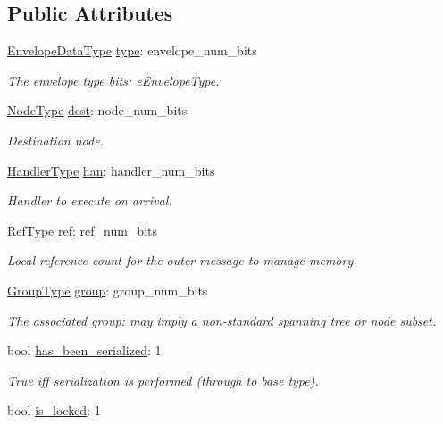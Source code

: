 \subsection*{Public Attributes}
\begin{DoxyCompactItemize}
\item 
\hyperlink{namespacevt_a2740126d59f361d9ba46f66b3b4b0d3d}{Envelope\+Data\+Type} \hyperlink{structvt_1_1messaging_1_1_active_envelope_aaa2cebe2e468e71249feff85841521d4}{type}\+: envelope\+\_\+num\+\_\+bits
\begin{DoxyCompactList}\small\item\em The envelope type bits\+: {\ttfamily e\+Envelope\+Type}. \end{DoxyCompactList}\item 
\hyperlink{namespacevt_a866da9d0efc19c0a1ce79e9e492f47e2}{Node\+Type} \hyperlink{structvt_1_1messaging_1_1_active_envelope_ad82d63430ef2ae4d03c1a986fa2f9350}{dest}\+: node\+\_\+num\+\_\+bits
\begin{DoxyCompactList}\small\item\em Destination node. \end{DoxyCompactList}\item 
\hyperlink{namespacevt_af64846b57dfcaf104da3ef6967917573}{Handler\+Type} \hyperlink{structvt_1_1messaging_1_1_active_envelope_a0d27da3b0da69281b7572ea29fcf61fc}{han}\+: handler\+\_\+num\+\_\+bits
\begin{DoxyCompactList}\small\item\em Handler to execute on arrival. \end{DoxyCompactList}\item 
\hyperlink{namespacevt_a9b39ce9494bb04674d0d5b895a5aa50f}{Ref\+Type} \hyperlink{structvt_1_1messaging_1_1_active_envelope_a61861e4316e9c65f7a18ba792da412e2}{ref}\+: ref\+\_\+num\+\_\+bits
\begin{DoxyCompactList}\small\item\em Local reference count for the outer message to manage memory. \end{DoxyCompactList}\item 
\hyperlink{namespacevt_a27b5e4411c9b6140c49100e050e2f743}{Group\+Type} \hyperlink{structvt_1_1messaging_1_1_active_envelope_a99173c33673ca13d681910bb07b9a7a0}{group}\+: group\+\_\+num\+\_\+bits
\begin{DoxyCompactList}\small\item\em The associated group\+: may imply a non-\/standard spanning tree or node subset. \end{DoxyCompactList}\item 
bool \hyperlink{structvt_1_1messaging_1_1_active_envelope_a340d6eae2a23ce99dc3e06f1ae2a5b81}{has\+\_\+been\+\_\+serialized}\+: 1
\begin{DoxyCompactList}\small\item\em True iff serialization is performed (through to base type). \end{DoxyCompactList}\item 
bool \hyperlink{structvt_1_1messaging_1_1_active_envelope_a17ded970dbc5c61160848d5ecf5c57ab}{is\+\_\+locked}\+: 1
\end{DoxyCompactItemize}


